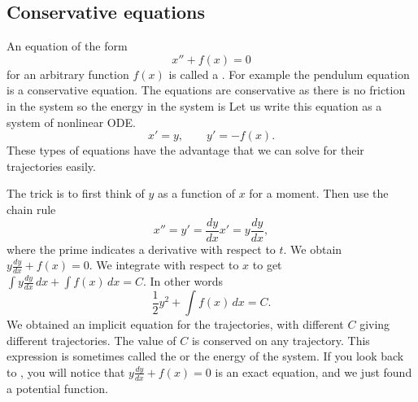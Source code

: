 \subsection{Conservative equations}

An equation of the form
\begin{equation*}
x'' + f(x) = 0
\end{equation*}
for an arbitrary function $f(x)$ is called a
\emph{}.  For example the pendulum equation
is a conservative equation.  The equations are conservative as there is no
friction in the system so the energy in the system is 
Let us write this equation as a
system of nonlinear ODE.
\begin{equation*}
x' = y, \qquad y' = -f(x) .
\end{equation*}
These types of equations have the
advantage that we can solve for their trajectories easily.

The trick is to first think of $y$ as a function of $x$ for a moment.  Then
use the chain rule
\begin{equation*}
x'' = y' = \frac{dy}{dx} x' = y \frac{dy}{dx} ,
\end{equation*}
where the prime indicates a derivative with respect to $t$.  
We obtain $y \frac{dy}{dx} + f(x) = 0$.  We integrate with respect to
$x$ to get
$\int y \frac{dy}{dx} \,dx + \int f(x)\, dx = C$.  In other words
\begin{equation*}
\frac{1}{2} y^2  + \int f(x)\, dx = C .
\end{equation*}
We obtained an implicit equation for the trajectories, with different $C$
giving different trajectories.  The value of
$C$ is conserved on any trajectory.  This expression is
sometimes called the \emph{} or the energy of the
system.
If you look back to , you will notice
that $y\frac{dy}{dx} + f(x) = 0$ is an exact equation, and
we just found a potential function.

